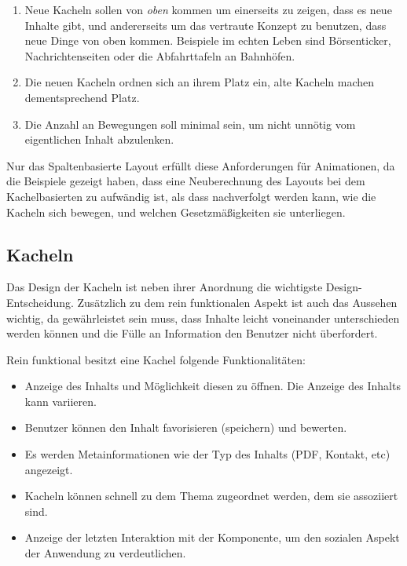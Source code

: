 \documentclass[12pt,twoside]{book}
\begin{document}
\begin{enumerate}
  \item Neue Kacheln sollen von \textit{oben} kommen um einerseits zu zeigen, dass es neue Inhalte gibt, und andererseits um das vertraute Konzept zu benutzen, dass neue Dinge von oben kommen. Beispiele im echten Leben sind Börsenticker, Nachrichtenseiten oder die Abfahrttafeln an Bahnhöfen.

  \item Die neuen Kacheln ordnen sich an ihrem Platz ein, alte Kacheln machen dementsprechend Platz.
  \item Die Anzahl an Bewegungen soll minimal sein, um nicht unnötig vom eigentlichen Inhalt abzulenken.
\end{enumerate}

Nur das Spaltenbasierte Layout erfüllt diese Anforderungen für Animationen, da die Beispiele gezeigt haben, dass eine Neuberechnung des Layouts bei dem Kachelbasierten zu aufwändig ist, als dass nachverfolgt werden kann, wie die Kacheln sich bewegen, und welchen Gesetzmäßigkeiten sie unterliegen.

\subsection{Kacheln}\label{sec:tiles}

Das Design der Kacheln ist neben ihrer Anordnung die wichtigste Design-Entscheidung. Zusätzlich zu dem rein funktionalen Aspekt ist auch das Aussehen wichtig, da gewährleistet sein muss, dass Inhalte leicht voneinander unterschieden werden können und die Fülle an Information den Benutzer nicht überfordert.

Rein funktional besitzt eine Kachel folgende Funktionalitäten:

\begin{itemize}
  \item Anzeige des Inhalts und Möglichkeit diesen zu öffnen. Die Anzeige des Inhalts kann variieren.
  \item Benutzer können den Inhalt favorisieren (speichern) und bewerten.
  \item Es werden Metainformationen wie der Typ des Inhalts (PDF, Kontakt, etc) angezeigt.
  \item Kacheln können schnell zu dem Thema zugeordnet werden, dem sie assoziiert sind.
  \item Anzeige der letzten Interaktion mit der Komponente, um den sozialen Aspekt der Anwendung zu verdeutlichen.
\end{itemize}
\end{document}
